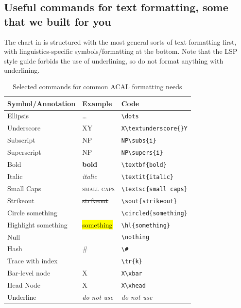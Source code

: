 \documentclass[output=paper,colorlinks,citecolor=brown,
]{langscibook}
\begin{document}
\subsection{Useful commands for text formatting, some that we built for you}
 \label{sec:diercks:UsefulShortcuts}

The chart in  is structured with the most general sorts of text formatting first, with linguistics-specific symbols/formatting at the bottom. Note that the LSP style guide forbids the use of underlining, so do not format anything with underlining. 

\begin{table}
\caption{Selected commands for common ACAL formatting needs}
\label{tab:diercks:CommandsTable}

	\begin{tabular}[t]{l l l}
		\toprule
		\textbf{Symbol/Annotation} & \textbf{Example} & \textbf{Code} \\ \midrule
		Ellipsis & \dots & \verb|\dots| \\
		Underscore & X\textunderscore{}Y & \verb|X\textunderscore{}Y| \\
		Subscript & NP\subs{i} & \verb|NP\subs{i}| \\
		Superscript & NP\supers{i} & \verb|NP\supers{i}|\\ 
		Bold & \textbf{bold} & \verb|\textbf{bold}| \\
		Italic & \textit{italic} & \verb|\textit{italic}| \\
		Small Caps & \textsc{small caps} & \verb|\textsc{small caps}| \\
		Strikeout & \sout{strikeout} & \verb|\sout{strikeout}| \\
		Circle something & \circled{something} & \verb|\circled{something}| \\
		Highlight something & \hl{something} & \verb|\hl{something}| \\
		Null & \nothing  & \verb|\nothing|\\
		Hash & \# & \verb|\#| \\
		Trace with index & \tr{k}  & \verb|\tr{k}| \\
		Bar-level node & X\xbar & \verb|X\xbar| \\
		Head Node & X\xhead & \verb|X\xhead| \\
		Underline & \textit{do not use} & \textit{do not use} \\
		\bottomrule
	\end{tabular}
\end{table}
\end{document}
